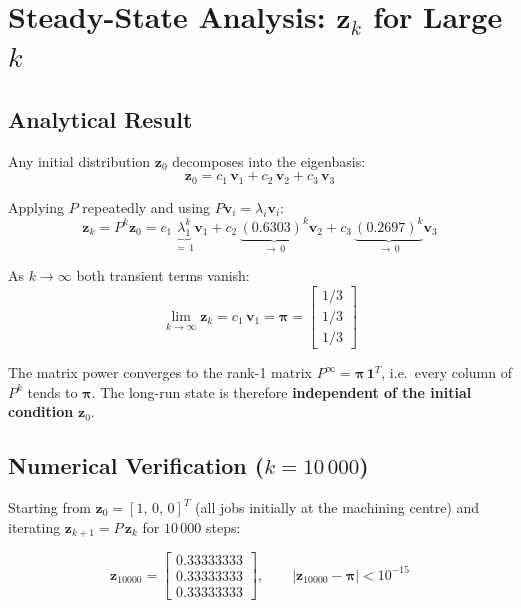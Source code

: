 \documentclass[12pt, a4paper]{article}
\begin{document}
\section{Steady-State Analysis: $\mathbf{z}_k$ for Large $k$}

\subsection*{Analytical Result}

Any initial distribution $\mathbf{z}_0$ decomposes into the eigenbasis:
\begin{equation}
  \mathbf{z}_0 = c_1\,\mathbf{v}_1 + c_2\,\mathbf{v}_2 + c_3\,\mathbf{v}_3
\end{equation}

Applying $P$ repeatedly and using $P\mathbf{v}_i = \lambda_i\mathbf{v}_i$:
\begin{equation}
  \mathbf{z}_k = P^k\mathbf{z}_0
    = c_1\,\underbrace{\lambda_1^k}_{=\,1}\mathbf{v}_1
    + c_2\,\underbrace{(0.6303)^k}_{\to\,0}\mathbf{v}_2
    + c_3\,\underbrace{(0.2697)^k}_{\to\,0}\mathbf{v}_3
\end{equation}

As $k \to \infty$ both transient terms vanish:
\begin{equation}
  \lim_{k\to\infty}\mathbf{z}_k = c_1\,\mathbf{v}_1 = \boldsymbol{\pi}
  = \begin{bmatrix} 1/3 \\ 1/3 \\ 1/3 \end{bmatrix}
\end{equation}

The matrix power converges to the rank-1 matrix
$P^\infty = \boldsymbol{\pi}\,\mathbf{1}^T$, i.e.\ every column of $P^k$ tends
to $\boldsymbol{\pi}$.  The long-run state is therefore
\textbf{independent of the initial condition} $\mathbf{z}_0$.

\subsection*{Numerical Verification ($k = 10\,000$)}

Starting from $\mathbf{z}_0 = [1,\,0,\,0]^T$ (all jobs initially at the machining
centre) and iterating $\mathbf{z}_{k+1} = P\,\mathbf{z}_k$ for $10\,000$ steps:

\begin{equation}
  \mathbf{z}_{10000} =
  \begin{bmatrix} 0.33333333 \\ 0.33333333 \\ 0.33333333 \end{bmatrix},
  \qquad
  \left|\mathbf{z}_{10000} - \boldsymbol{\pi}\right| < 10^{-15}
\end{equation}
\end{document}
